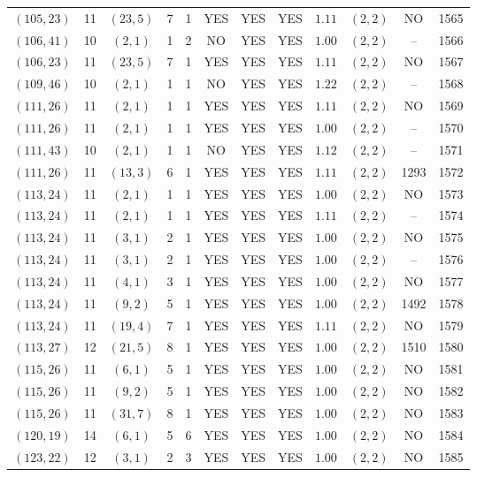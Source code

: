 \begin{longtable}{|c|c|c|c|c|c|c|c|c|c|c|c|}
$(105,23)$ & 11 & $(23,5)$ & 7 & 1 & YES & YES & YES & $1.11$ & $(2,2)$ & NO & 1565\\
$(106,41)$ & 10 & $(2,1)$ & 1 & 2 & NO & YES & YES & $1.00$ & $(2,2)$ & -- & 1566\\
$(106,23)$ & 11 & $(23,5)$ & 7 & 1 & YES & YES & YES & $1.11$ & $(2,2)$ & NO & 1567\\
$(109,46)$ & 10 & $(2,1)$ & 1 & 1 & NO & YES & YES & $1.22$ & $(2,2)$ & -- & 1568\\
$(111,26)$ & 11 & $(2,1)$ & 1 & 1 & YES & YES & YES & $1.11$ & $(2,2)$ & NO & 1569\\
$(111,26)$ & 11 & $(2,1)$ & 1 & 1 & YES & YES & YES & $1.00$ & $(2,2)$ & -- & 1570\\
$(111,43)$ & 10 & $(2,1)$ & 1 & 1 & NO & YES & YES & $1.12$ & $(2,2)$ & -- & 1571\\
$(111,26)$ & 11 & $(13,3)$ & 6 & 1 & YES & YES & YES & $1.11$ & $(2,2)$ & 1293 & 1572\\
$(113,24)$ & 11 & $(2,1)$ & 1 & 1 & YES & YES & YES & $1.00$ & $(2,2)$ & NO & 1573\\
$(113,24)$ & 11 & $(2,1)$ & 1 & 1 & YES & YES & YES & $1.11$ & $(2,2)$ & -- & 1574\\
$(113,24)$ & 11 & $(3,1)$ & 2 & 1 & YES & YES & YES & $1.00$ & $(2,2)$ & NO & 1575\\
$(113,24)$ & 11 & $(3,1)$ & 2 & 1 & YES & YES & YES & $1.00$ & $(2,2)$ & -- & 1576\\
$(113,24)$ & 11 & $(4,1)$ & 3 & 1 & YES & YES & YES & $1.00$ & $(2,2)$ & NO & 1577\\
$(113,24)$ & 11 & $(9,2)$ & 5 & 1 & YES & YES & YES & $1.00$ & $(2,2)$ & 1492 & 1578\\
$(113,24)$ & 11 & $(19,4)$ & 7 & 1 & YES & YES & YES & $1.11$ & $(2,2)$ & NO & 1579\\
$(113,27)$ & 12 & $(21,5)$ & 8 & 1 & YES & YES & YES & $1.00$ & $(2,2)$ & 1510 & 1580\\
$(115,26)$ & 11 & $(6,1)$ & 5 & 1 & YES & YES & YES & $1.00$ & $(2,2)$ & NO & 1581\\
$(115,26)$ & 11 & $(9,2)$ & 5 & 1 & YES & YES & YES & $1.00$ & $(2,2)$ & NO & 1582\\
$(115,26)$ & 11 & $(31,7)$ & 8 & 1 & YES & YES & YES & $1.00$ & $(2,2)$ & NO & 1583\\
$(120,19)$ & 14 & $(6,1)$ & 5 & 6 & YES & YES & YES & $1.00$ & $(2,2)$ & NO & 1584\\
$(123,22)$ & 12 & $(3,1)$ & 2 & 3 & YES & YES & YES & $1.00$ & $(2,2)$ & NO & 1585\\

\end{longtable}
